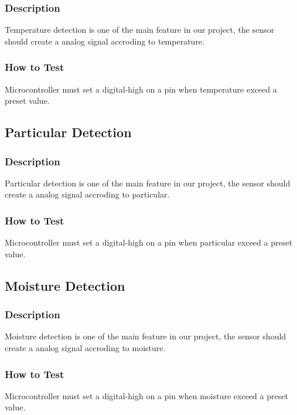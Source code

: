 \documentclass[letterpaper,12pt,notitlepage]{article}
\begin{document}
		\subsubsection{Description}
			\par Temperature detection is one of the main feature in our project, the sensor should 
			create a analog signal accroding to temperature. 
		\subsubsection{How to Test}
			\par Microcontroller must set a digital-high on a pin when temperature exceed a preset value. 

	\subsection{Particular Detection}
		\subsubsection{Description}
			\par Particular detection is one of the main feature in our project, the sensor should 
			create a analog signal accroding to particular. 
		\subsubsection{How to Test}
			\par Microcontroller must set a digital-high on a pin when particular exceed a preset value. 

	\subsection{Moisture Detection}
		\subsubsection{Description}
			\par Moisture detection is one of the main feature in our project, the sensor should 
				create a analog signal accroding to moisture. 
		\subsubsection{How to Test}
			\par Microcontroller must set a digital-high on a pin when moisture exceed a preset value. 
\end{document}
